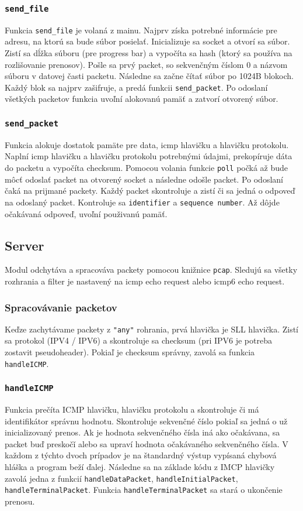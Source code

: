 \documentclass{article}
\renewcommand{\tt}[1]{\texttt{#1}}
\begin{document}
\subsubsection{\tt{send\_file}}
Funkcia \tt{send\_file} je volaná z mainu. 
Najprv získa potrebné informácie pre adresu, na ktorú sa bude súbor posielať.
Inicializuje sa socket a otvorí sa súbor.
Zistí sa dĺžka súboru (pre progress bar) a vypočíta sa hash (ktorý sa používa na rozlišovanie prenosov).
Pošle sa prvý packet, so sekvenčným číslom 0 a názvom súboru v datovej časti packetu.
Následne sa začne čítať súbor po 1024B blokoch.
Každý blok sa najprv zašifruje, a predá funkcii \tt{send\_packet}.
Po odoslaní všetkých packetov funkcia uvoľní alokovanú pamäť a zatvorí otvorený súbor.

\subsubsection{\tt{send\_packet}}
Funkcia alokuje dostatok pamäte pre data, icmp hlavičku a hlavičku protokolu.
Naplní icmp hlavičku a hlavičku protokolu potrebnými údajmi, prekopíruje dáta do packetu a vypočíta checksum.
Pomocou volania funkcie \tt{poll} počká až bude môcť odoslať packet na otvorený socket a následne odošle packet.
Po odoslaní čaká na prijmané packety.
Každý packet skontroluje a zistí či sa jedná o odpoveď na odoslaný packet. 
Kontroluje sa \tt{identifier} a \tt{sequence number}.
Až dôjde očakávaná odpoveď, uvoľní použivanú pamäť.

\subsection{Server}
Modul odchytáva a spracováva packety pomocou knižnice \tt{pcap}.
Sledujú sa všetky rozhrania a filter je nastavený na icmp echo request alebo icmp6 echo request.

\subsubsection{Spracovávanie packetov}
Keďze zachytávame packety z \tt{"any"} rohrania, prvá hlavička je SLL hlavička.
Zistí sa protokol (IPV4 / IPV6) a skontroluje sa checksum (pri IPV6 je potreba zostavit pseudoheader).
Pokiaľ je checksum správny, zavolá sa funkcia \tt{handleICMP}.

\subsubsection{\tt{handleICMP}}
Funkcia prečíta ICMP hlavičku, hlavičku protokolu a skontroluje či má identifikátor správnu hodnotu.
Skontroluje sekvenčné číslo pokiaľ sa jedná o už inicializovaný prenos.
Ak je hodnota sekvenčného čísla iná ako očakávana, sa packet buď preskočǐ alebo sa upraví hodnota očakávaného sekvenčného čísla.
V každom z týchto dvoch prípadov je na štandardný výstup vypísaná chybová hláška a program beží ďalej.
Následne sa na základe kódu z IMCP hlavičky zavolá jedna z funkcií \tt{handleDataPacket}, 
\tt{handleInitialPacket}, \tt{handleTerminalPacket}.
Funkcia \tt{handleTerminalPacket} sa stará o ukončenie prenosu.
\end{document}
